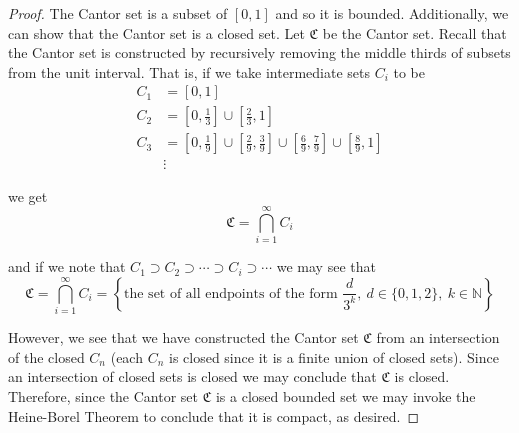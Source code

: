 \documentclass[12pt]{article}
\newlength\tindent
\renewcommand{\indent}{\hspace*{\tindent}}
\newcommand{\N}{\mathbb N}
\begin{document}
\begin{proof} The Cantor set is a subset of $[0, 1]$ and so it is bounded. Additionally, we can show that the Cantor set is a closed set. Let $\mathfrak C$ be the Cantor set. Recall that the Cantor set is constructed by recursively removing the middle thirds of subsets from the unit interval. That is, if we take intermediate sets $C_i$ to be
\begin{align*}
	C_1 &= [0, 1] \\
	C_2 &= \left[ 0, \frac{1}{3} \right] \cup \left[ \frac{2}{3}, 1 \right] \\
	C_3 &= \left[ 0, \frac{1}{9} \right] \cup \left[ \frac{2}{9}, \frac{3}{9} \right] \cup \left[ \frac{6}{9}, \frac{7}{9} \right] \cup \left[ \frac{8}{9}, 1 \right] \\
	&\vdots
\end{align*}

we get
\begin{equation*}
	\mathfrak C = \bigcap^\infty_{i = 1} C_i
\end{equation*}

and if we note that $C_1 \supset C_2 \supset \cdots \supset C_i \supset \cdots$ we may see that
\begin{equation*}
	\mathfrak C = \bigcap^\infty_{i = 1} C_i = \left\{ \text{the set of all endpoints of the form } \frac{d}{3^k},~d \in \{0, 1 , 2\},~k\in \N \right\}
\end{equation*}

\indent However, we see that we have constructed the Cantor set $\mathfrak C$ from an intersection of the closed $C_n$ (each $C_n$ is closed since it is a finite union of closed sets). Since an intersection of closed sets is closed we may conclude that $\mathfrak C$ is closed. Therefore, since the Cantor set $\mathfrak C$ is a closed bounded set we may invoke the Heine-Borel Theorem to conclude that it is compact, as desired.
\end{proof}
\end{document}
